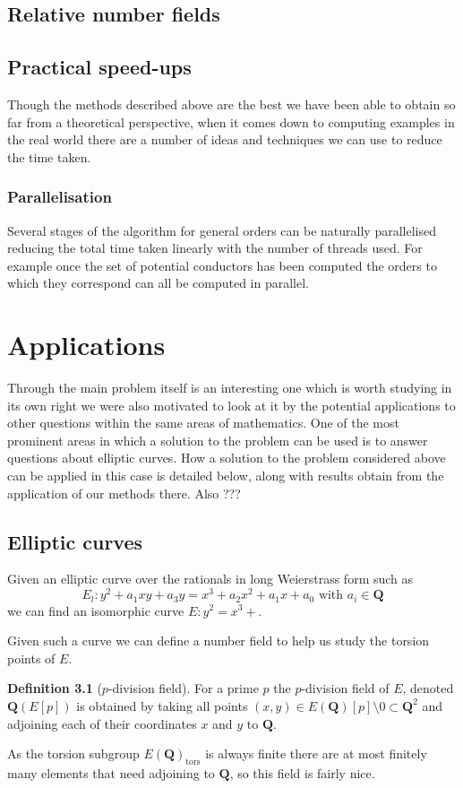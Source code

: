 \documentclass[a4paper,abstracton]{scrreprt}
\theoremstyle{definition}
\newtheorem{defn}{Definition}
\newcommand{\QQ}{\mathbf{Q}}
\begin{document}
\section{Relative number fields}


\section{Practical speed-ups}
Though the methods described above are the best we have been able to obtain so far from a theoretical perspective, when it comes down to computing examples in the real world there are a number of ideas and techniques we can use to reduce the time taken.

\subsection{Parallelisation}
Several stages of the algorithm for general orders can be naturally parallelised reducing the total time taken linearly with the number of threads used.
For example once the set of potential conductors has been computed the orders to which they correspond can all be computed in parallel.


\chapter{Applications}

Through the main problem itself is an interesting one which is worth studying in its own right we were also motivated to look at it by the potential applications to other questions within the same areas of mathematics.
One of the most prominent areas in which a solution to the problem can be used is to answer questions about elliptic curves.
How a solution to the problem considered above can be applied in this case is detailed below, along with results obtain from the application of our methods there.
Also ???

\section{Elliptic curves}
\label{sec:ell}
Given an elliptic curve over the rationals in long Weierstrass form such as
\[E_l \colon y^2 + a_1xy + a_3y = x^3 + a_2x^2 + a_1x + a_0\text{ with }a_i \in \QQ\]
we can find an isomorphic curve $E \colon y^2 = x^3 + $.

Given such a curve we can define a number field to help us study the torsion points of $E$.
\begin{defn}[$p$-division field]
For a prime $p$ the $p$-division field of $E$, denoted $\QQ(E[p])$ is obtained by taking all points $(x,y) \in E(\QQ)[p]\setminus 0\subset \QQ^2$ and adjoining each of their coordinates $x$ and $y$ to $\QQ$.
\end{defn}
As the torsion subgroup $E(\QQ)_\text{tors}$ is always finite there are at most finitely many elements that need adjoining to $\QQ$, so this field is fairly nice.
\end{document}
